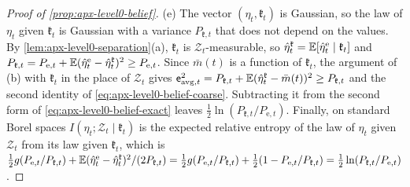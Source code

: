 \begin{proof}[Proof of \cref{prop:apx-level0-belief}]
(e) The vector $(\eta_t,\mathfrak k_t)$ is Gaussian, so the law of $\eta_t$ given $\mathfrak k_t$ is Gaussian with a variance $P_{\mathfrak k,t}$ that does not depend on the values. By \cref{lem:apx-level0-separation}(a), $\mathfrak k_t$ is $\mathcal Z_t$-measurable, so $\hat\eta^{\mathfrak k}_t=\mathbb{E}[\hat\eta^{\mathrm e}_t\mid\mathfrak k_t]$ and $P_{\mathfrak k,t}=P_{\mathrm e,t}+\mathbb{E}(\hat\eta^{\mathrm e}_t-\hat\eta^{\mathfrak k}_t)^2\ge P_{\mathrm e,t}$. Since $\bar m(t)$ is a function of $\mathfrak k_t$, the argument of (b) with $\mathfrak k_t$ in the place of $\mathcal Z_t$ gives $\mathsf e_{\mathrm{avg},t}^2=P_{\mathfrak k,t}+\mathbb{E}(\hat\eta^{\mathfrak k}_t-\bar m(t))^2\ge P_{\mathfrak k,t}$ and the second identity of \eqref{eq:apx-level0-belief-coarse}. Subtracting it from the second form of \eqref{eq:apx-level0-belief-exact} leaves $\frac12\ln(P_{\mathfrak k,t}/P_{\mathrm e,t})$. Finally, on standard Borel spaces $I(\eta_t;\mathcal Z_t\mid\mathfrak k_t)$ is the expected relative entropy of the law of $\eta_t$ given $\mathcal Z_t$ from its law given $\mathfrak k_t$, which is $\frac12g(P_{\mathrm e,t}/P_{\mathfrak k,t})+\mathbb{E}(\hat\eta^{\mathrm e}_t-\hat\eta^{\mathfrak k}_t)^2/(2P_{\mathfrak k,t})=\frac12g(P_{\mathrm e,t}/P_{\mathfrak k,t})+\frac12(1-P_{\mathrm e,t}/P_{\mathfrak k,t})=\frac12\ln(P_{\mathfrak k,t}/P_{\mathrm e,t})$.
\end{proof}

